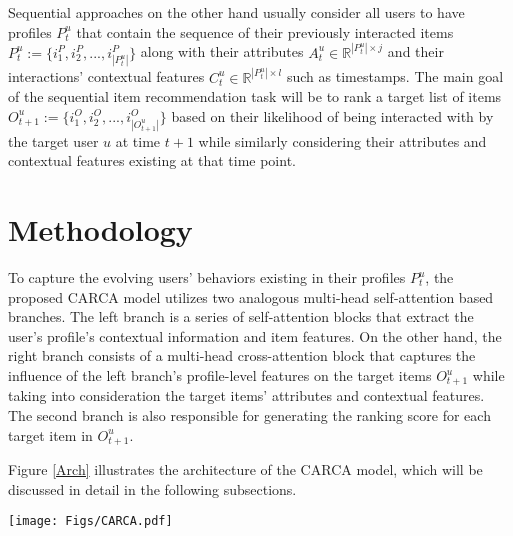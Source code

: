 \documentclass[sigconf,natbib=true]{acmart}
\begin{document}
Sequential approaches on the other hand usually consider all users to have profiles $P^{u}_{t}$ that contain the sequence of their previously interacted items $P^{u}_{t} := \{i^{P}_{1}, i^{P}_{2}, ..., i^{P}_{|P^{u}_{t}|}\}$ along with their attributes $A^{u}_{t} \in \mathbb{R}^{ |P^{u}_{t}| \times j} $ and their interactions' contextual features $C^{u}_{t} \in \mathbb{R}^{ |P^{u}_{t}| \times l} $ such as timestamps. The main goal of the sequential item recommendation task will be to rank a target list of items $O^{u}_{t+1} := \{i^{O}_{1}, i^{O}_{2}, ..., i^{O}_{|O^{u}_{t+1}|}\}$ based on their likelihood of being interacted with by the target user $u$ at time $t+1$ while similarly considering their attributes and contextual features existing at that time point.






\section{Methodology}
To capture the evolving users' behaviors existing in their profiles $P^{u}_{t}$, the proposed CARCA model utilizes two analogous multi-head self-attention based branches. The left branch is a series of self-attention blocks that extract the user's profile's contextual information and item features. On the other hand, the right branch consists of a multi-head cross-attention block that captures the influence of the left branch's profile-level features on the target items $O^{u}_{t+1}$ while taking into consideration the target items' attributes and contextual features. The second branch is also responsible for generating the ranking score for each target item in $O^{u}_{t+1}$.

Figure \ref{Arch} illustrates the architecture of the CARCA model, which will be discussed in detail in the following subsections.

\begin{figure*}[!ht]
\centering
\texttt{[image: Figs/CARCA.pdf]}
\caption{Illustration of the CARCA model, which is composed of two main branches, namely the profile-level features extraction branch on the left and the target items cross-attention scoring branch on the right.}
\label{Arch}
\end{figure*}
\end{document}
